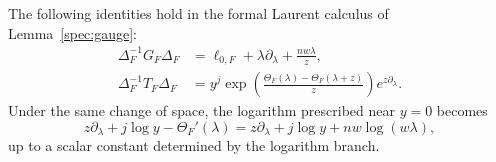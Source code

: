 \begin{lemma}\label{fixed:classical}
The following identities hold in the formal Laurent calculus of
Lemma~\ref{spec:gauge}:
\begin{align}
 \Delta_F^{-1}G_F\Delta_F
  &=\ell_{0,F}+\lambda\partial_\lambda+\frac{nw\lambda}{z},
       \label{fixed:grading-conjugation}\\
 \Delta_F^{-1}T_F\Delta_F
  &=y^j\exp\left(
       \frac{\Theta_F(\lambda)-\Theta_F(\lambda+z)}{z}
                  \right)e^{z\partial_\lambda}.
       \label{fixed:shift-conjugation}
\end{align}
Under the same change of space, the logarithm prescribed near $y=0$
becomes
\begin{equation}\label{fixed:log-conjugation}
 z\partial_\lambda+j\log y-\Theta_F'(\lambda)
   =z\partial_\lambda+j\log y+nw\log(w\lambda),
\end{equation}
up to a scalar constant determined by the logarithm branch.
\end{lemma}

